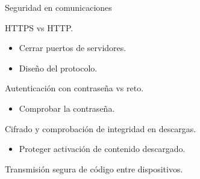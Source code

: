 \begin{frame}{Seguridad en comunicaciones}
\begin{wideitemize}
    \item<+-> HTTPS vs HTTP.
    \begin{itemize}
        \item<+-> Cerrar puertos de servidores.
        \item<+-> Diseño del protocolo.
    \end{itemize}

    \item<+-> Autenticación con contraseña vs reto.
    \begin{itemize}
        \item<+-> Comprobar la contraseña.
    \end{itemize}

    \item<+-> Cifrado y comprobación de integridad en descargas.
    \begin{itemize}
        \item<+-> Proteger activación de contenido descargado.
    \end{itemize}

    \item<+-> Transmisión segura de código entre dispositivos.
\end{wideitemize}
\end{frame}
